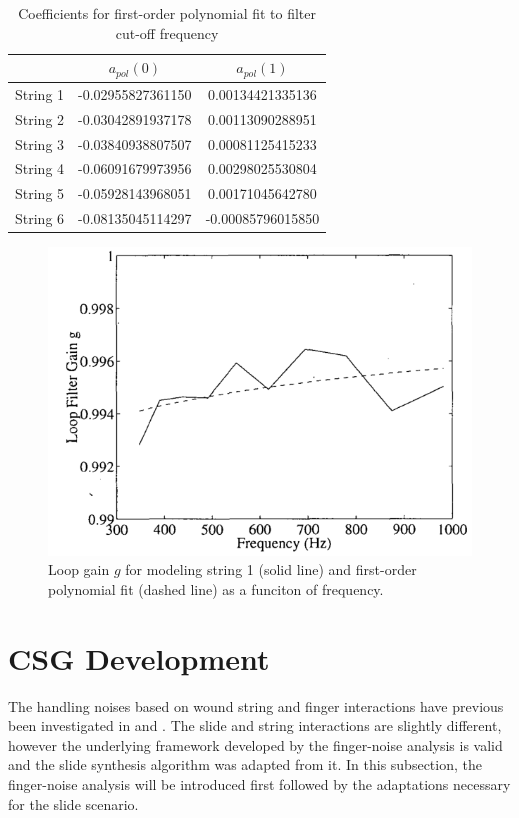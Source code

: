 \documentclass[main.tex]{subfiles}
\begin{document}
\begin{table}[h]
\centering
\begin{tabular}{|c| c| c|} 
 \hline
     & $a_{pol}(0)$ & $a_{pol}(1)$ \\ [0.5ex] 
 \hline
 String 1 & -0.02955827361150  & 0.00134421335136 \\ 
 String 2 & -0.03042891937178  & 0.00113090288951 \\ 
 String 3 & -0.03840938807507  & 0.00081125415233 \\ 
 String 4 & -0.06091679973956  & 0.00298025530804 \\ 
 String 5 & -0.05928143968051  & 0.00171045642780 \\ 
 String 6 & -0.08135045114297  & -0.00085796015850 \\ 
 \hline
\end{tabular}
\caption{Coefficients for first-order polynomial fit to filter cut-off frequency }
\label{tab:a_coeff}
\end{table}

\begin{figure}[h]
    \centering
    \includegraphics[scale=.75]{./images/plots/Figure18Orig.png}
    \caption{Loop gain $g$ for modeling string 1 (solid line) and first-order polynomial fit (dashed line) as a funciton of frequency. }
    \label{fig:originalLoopGain}
\end{figure}

\section{CSG Development}
The handling noises based on wound string and finger interactions have previous been investigated in  and . The slide and string interactions are slightly different, however the underlying framework developed by the finger-noise analysis is valid and the slide synthesis algorithm was adapted from it. In this subsection, the finger-noise analysis will be introduced first followed by the adaptations necessary for the slide scenario.
\end{document}
